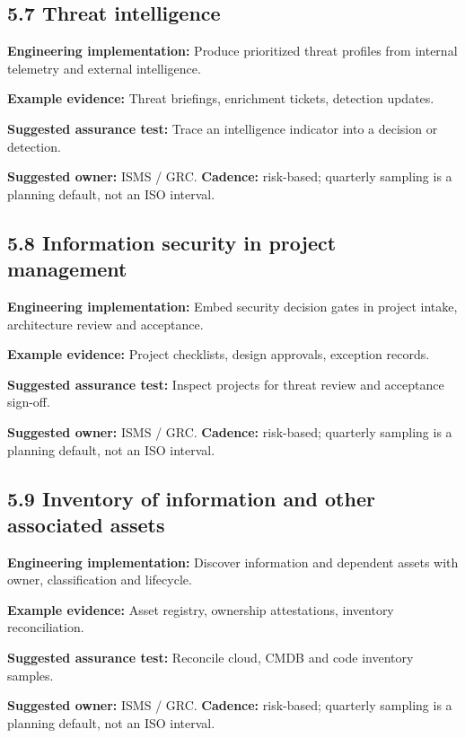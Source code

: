 \documentclass[11pt,letterpaper]{article}
\begin{document}
\subsection{5.7 Threat intelligence}
\textbf{Engineering implementation:} Produce prioritized threat profiles from internal telemetry and external intelligence.\par
\textbf{Example evidence:} Threat briefings, enrichment tickets, detection updates.\par
\textbf{Suggested assurance test:} Trace an intelligence indicator into a decision or detection.\par
\textbf{Suggested owner:} ISMS / GRC. \textbf{Cadence:} risk-based; quarterly sampling is a planning default, not an ISO interval.\par
{}
\subsection{5.8 Information security in project management}
\textbf{Engineering implementation:} Embed security decision gates in project intake, architecture review and acceptance.\par
\textbf{Example evidence:} Project checklists, design approvals, exception records.\par
\textbf{Suggested assurance test:} Inspect projects for threat review and acceptance sign-off.\par
\textbf{Suggested owner:} ISMS / GRC. \textbf{Cadence:} risk-based; quarterly sampling is a planning default, not an ISO interval.\par
{}
\subsection{5.9 Inventory of information and other associated assets}
\textbf{Engineering implementation:} Discover information and dependent assets with owner, classification and lifecycle.\par
\textbf{Example evidence:} Asset registry, ownership attestations, inventory reconciliation.\par
\textbf{Suggested assurance test:} Reconcile cloud, CMDB and code inventory samples.\par
\textbf{Suggested owner:} ISMS / GRC. \textbf{Cadence:} risk-based; quarterly sampling is a planning default, not an ISO interval.\par
{}
\end{document}

